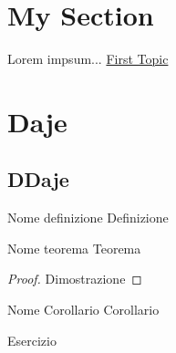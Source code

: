 \documentclass[11pt, a4paper, twoside]{article}
\begin{document}
\section{My Section}
\label{sec:my-section}

Lorem impsum... \hyperref[sec:my-section]{First Topic}


\section{Daje}

\subsection{DDaje}

\begin{defn}{Nome definizione}{}
	Definizione
\end{defn}

\begin{thm}{Nome teorema}{}
	Teorema
\end{thm}

\begin{proof}
	Dimostrazione
\end{proof}

\begin{cor}{Nome Corollario}{}
	Corollario
\end{cor}

\begin{ese}
	Esercizio
\end{ese}

\begin{sol}
\end{sol}
\end{document}
